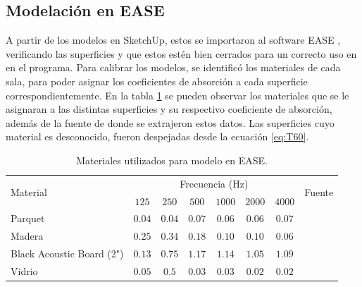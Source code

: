\subsection{Modelación en EASE}
A partir de los modelos en SketchUp, estos se importaron al software EASE \cite{ease}, verificando las superficies y que estos estén bien cerrados para un correcto uso en en el programa. Para calibrar los modelos, se identificó los materiales de cada sala, para poder asignar los coeficientes de absorción a cada superficie correspondientemente. En la tabla \ref{tab:materiales-ease} se pueden observar los materiales que se le asignaran a las distintas superficies y su respectivo coeficiente de absorción, además de la fuente de donde se extrajeron estos datos. Las superficies cuyo material es desconocido, fueron despejadas desde la ecuación \ref{eq:T60}.


\begin{table}[H]
    \centering
    \caption{Materiales utilizados para modelo en EASE.}
    \label{tab:materiales-ease}
    \begin{tabular}{|l|cccccc|c|}
    \hline
    \multirow{2}{*}{Material} & \multicolumn{6}{c|}{Frecuencia (Hz)}                                                                          & \multirow{2}{*}{Fuente} \\ \cline{2-7} 
            & \multicolumn{1}{c|}{$125$} & \multicolumn{1}{c|}{$250$} & \multicolumn{1}{c|}{$500$} & \multicolumn{1}{c|}{$1000$} & \multicolumn{1}{c|}{$2000$} & $4000$ & \\ \hline
    Parquet & \multicolumn{1}{c|}{$0.04$} & \multicolumn{1}{c|}{$0.04$} & \multicolumn{1}{c|}{$0.07$} & \multicolumn{1}{c|}{$0.06$} & \multicolumn{1}{c|}{$0.06$} &  $0.07$ & \cite{Recuero}\\ \hline
    Madera  & \multicolumn{1}{c|}{$0.25$} & \multicolumn{1}{c|}{$0.34$} & \multicolumn{1}{c|}{$0.18$} & \multicolumn{1}{c|}{$0.10$} & \multicolumn{1}{c|}{$0.10$} &  $0.06$ & \cite{Recuero}\\  \hline
    Black Acoustic Board (2") & \multicolumn{1}{c|}{$0.13$} & \multicolumn{1}{c|}{$0.75$} & \multicolumn{1}{c|}{$1.17$} & \multicolumn{1}{c|}{$1.14$} & \multicolumn{1}{c|}{$1.05$} & $1.09$ & \cite{blackboard}\\ \hline
    Vidrio  & \multicolumn{1}{c|}{$0.05$} & \multicolumn{1}{c|}{$0.5$} & \multicolumn{1}{c|}{$0.03$} & \multicolumn{1}{c|}{$0.03$} & \multicolumn{1}{c|}{$0.02$} & $0.02$ & \cite{Recuero}\\ \hline
    \end{tabular}
\end{table}

